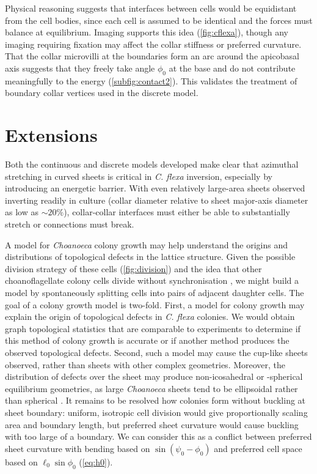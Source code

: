 Physical reasoning suggests that interfaces between cells would be equidistant from the cell bodies, since each cell is assumed to be identical and the forces must balance at equilibrium. 
Imaging supports this idea (\cref{fig:cflexa}), though any imaging requiring fixation may affect the collar stiffness or preferred curvature.
That the collar microvilli at the boundaries form an arc around the apicobasal axis suggests that they freely take angle $\phi_0$ at the base and do not contribute meaningfully to the energy (\cref{subfig:contact2}). 
This validates the treatment of boundary collar vertices used in the discrete model.

\section{Extensions}

Both the continuous and discrete models developed make clear that azimuthal stretching in curved sheets is critical in \textit{C. flexa} inversion, especially by introducing an energetic barrier.
With even relatively large-area sheets observed inverting readily in culture (collar diameter relative to sheet major-axis diameter as low as $\sim20\%$), collar-collar interfaces must either be able to substantially stretch or connections must break.

A model for \textit{Choanoeca} colony growth may help understand the origins and distributions of topological defects in the lattice structure. 
Given the possible division strategy of these cells (\cref{fig:division}) and the idea that other choanoflagellate colony cells divide without synchronisation \citep{larson2020}, we might build a model by spontaneously splitting cells into pairs of adjacent daughter cells.
The goal of a colony growth model is two-fold.
First, a model for colony growth may explain the origin of topological defects in \textit{C. flexa} colonies.
We would obtain graph topological statistics that are comparable to experiments to determine if this method of colony growth is accurate or if another method produces the observed topological defects.
Second, such a model may cause the cup-like sheets observed, rather than sheets with other complex geometries.
Moreover, the distribution of defects over the sheet may produce non-icosahedral or -spherical equilibrium geometries, as large \textit{Choanoeca} sheets tend to be ellipsoidal rather than spherical \citep{leadbeater1983,brunet2019}.
It remains to be resolved how colonies form without buckling at sheet boundary: uniform, isotropic cell division would give proportionally scaling area and boundary length, but preferred sheet curvature would cause buckling with too large of a boundary.
We can consider this as a conflict between preferred sheet curvature with bending based on $\sin (\psi_0 - \phi_0)$ and preferred cell space based on $\ell_0 \sin \phi_0$ (\cref{eq:h0}).

